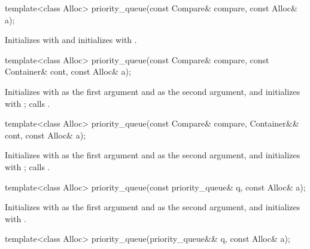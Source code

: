 \documentclass{wg21}
\begin{document}
%
\begin{itemdecl}
    template<class Alloc> priority_queue(const Compare& compare, const Alloc& a);
\end{itemdecl}

\begin{itemdescr}
    \pnum
    \effects
    Initializes  with  and initializes  with .
\end{itemdescr}

%
\begin{itemdecl}
    template<class Alloc>
    priority_queue(const Compare& compare, const Container& cont, const Alloc& a);
\end{itemdecl}

\begin{itemdescr}
    \pnum
    \effects
    Initializes  with  as the first argument and  as the second
    argument, and initializes  with ;
    calls .
\end{itemdescr}

%
\begin{itemdecl}
    template<class Alloc>
    priority_queue(const Compare& compare, Container&& cont, const Alloc& a);
\end{itemdecl}

\begin{itemdescr}
    \pnum
    \effects
    Initializes  with  as the first argument and 
    as the second argument, and initializes  with ;
    calls .
\end{itemdescr}

%
\begin{itemdecl}
    template<class Alloc> priority_queue(const priority_queue& q, const Alloc& a);
\end{itemdecl}

\begin{itemdescr}
    \pnum
    \effects
    Initializes  with  as the first argument and  as
    the second argument, and initializes  with .
\end{itemdescr}

%
\begin{itemdecl}
    template<class Alloc> priority_queue(priority_queue&& q, const Alloc& a);
\end{itemdecl}
\end{document}
